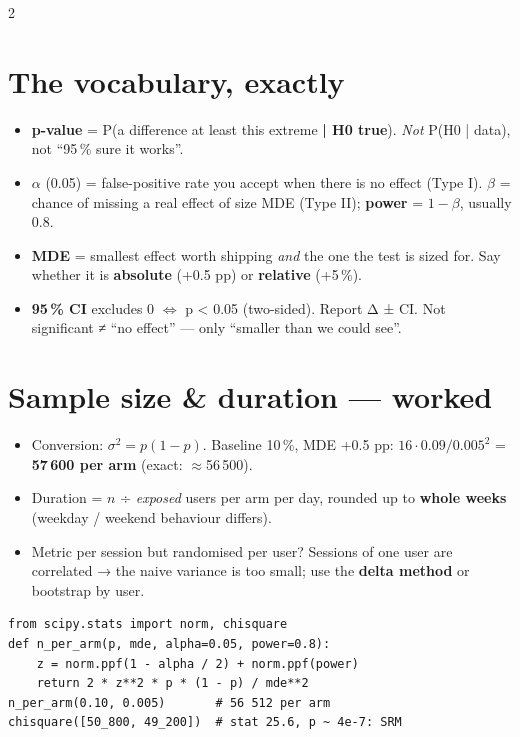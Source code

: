 \documentclass[8pt]{extarticle}
\begin{document}
\begin{multicols}{2}
\small{}\raggedright

\section{The vocabulary, exactly}
\begin{itemize}
  \item \textbf{p-value} = P(a difference at least this extreme \textbf{| H0 true}). \emph{Not}
        P(H0 | data), not ``95\,\% sure it works''.
  \item \textbf{$\alpha$} (0.05) = false-positive rate you accept when there is no effect (Type I).
        \textbf{$\beta$} = chance of missing a real effect of size MDE (Type II); \textbf{power} = $1-\beta$, usually 0.8.
  \item \textbf{MDE} = smallest effect worth shipping \emph{and} the one the test is sized for.
        Say whether it is \textbf{absolute} (+0.5 pp) or \textbf{relative} (+5\,\%).
  \item \textbf{95\,\% CI} excludes 0 $\Leftrightarrow$ p < 0.05 (two-sided). Report Δ ± CI.
        Not significant ≠ ``no effect'' — only ``smaller than we could see''.
\end{itemize}

\section{Sample size \& duration — worked}
\begin{itemize}
  \item Conversion: $\sigma^2 = p(1-p)$. Baseline 10\,\%, MDE +0.5 pp: $16 \cdot 0.09 / 0.005^2$ =
        \textbf{57\,600 per arm} (exact: $\approx$56\,500).
  \item Duration = $n$ ÷ \emph{exposed} users per arm per day, rounded up to \textbf{whole weeks}
        (weekday / weekend behaviour differs).
  \item Metric per session but randomised per user? Sessions of one user are correlated → the naive
        variance is too small; use the \textbf{delta method} or bootstrap by user.
\end{itemize}
\begin{lstlisting}
from scipy.stats import norm, chisquare
def n_per_arm(p, mde, alpha=0.05, power=0.8):
    z = norm.ppf(1 - alpha / 2) + norm.ppf(power)
    return 2 * z**2 * p * (1 - p) / mde**2
n_per_arm(0.10, 0.005)       # 56 512 per arm
chisquare([50_800, 49_200])  # stat 25.6, p ~ 4e-7: SRM
\end{lstlisting}


\end{multicols}
\end{document}
